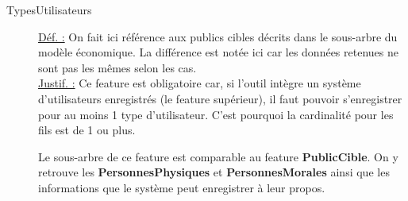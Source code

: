 \begin{description}
\item [TypesUtilisateurs]
\underline{Déf. :}  On fait ici référence aux publics cibles décrits dans le sous-arbre du modèle économique.  La différence est notée ici car les données retenues ne sont pas les mêmes selon les cas.
\\ \underline{Justif. :}  Ce feature est obligatoire car,  si l'outil intègre un système d'utilisateurs enregistrés (le feature supérieur),  il faut pouvoir s'enregistrer pour au moins 1 type d'utilisateur.   C'est pourquoi la cardinalité pour les fils est de 1 ou plus.
\newline

Le sous-arbre de ce feature est comparable au feature \textbf{PublicCible}.  On y retrouve les \textbf{PersonnesPhysiques} et \textbf{PersonnesMorales} ainsi que les informations que le système peut enregistrer à leur propos.


\end{description}
